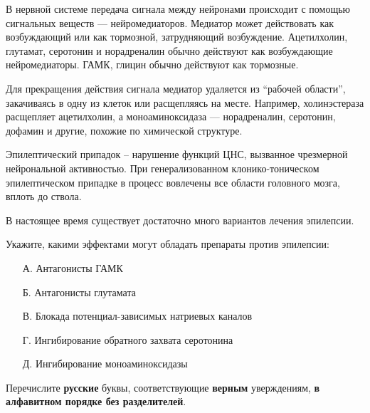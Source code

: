 
В нервной системе передача сигнала между нейронами происходит с помощью сигнальных веществ — нейромедиаторов. Медиатор может действовать как возбуждающий или как тормозной, затрудняющий возбуждение. Ацетилхолин, глутамат, серотонин и норадреналин обычно действуют как возбуждающие нейромедиаторы. ГАМК, глицин обычно действуют как тормозные.

Для прекращения действия сигнала медиатор удаляется из “рабочей области”, закачиваясь в одну из клеток или расщепляясь на месте. Например, холинэстераза расщепляет ацетилхолин, а моноаминоксидаза — норадреналин, серотонин, дофамин и другие, похожие по химической структуре.

Эпилептический припадок – нарушение функций ЦНС, вызванное чрезмерной нейрональной активностью. При генерализованном клонико-тоническом эпилептическом припадке в процесс вовлечены все области головного мозга, вплоть до ствола.

В настоящее время существует достаточно много вариантов лечения эпилепсии.

Укажите, какими эффектами могут обладать препараты против эпилепсии:
\begin{enumerate}
    \item[А.] Антагонисты ГАМК
    \item[Б.] Антагонисты глутамата
    \item[В.] Блокада потенциал-зависимых натриевых каналов
    \item[Г.] Ингибирование обратного захвата серотонина
    \item[Д.] Ингибирование моноаминоксидазы
\end{enumerate} 

Перечислите \textbf{русские} буквы, соответствующие \textbf{верным} уверждениям, \textbf{в алфавитном порядке без разделителей}.

